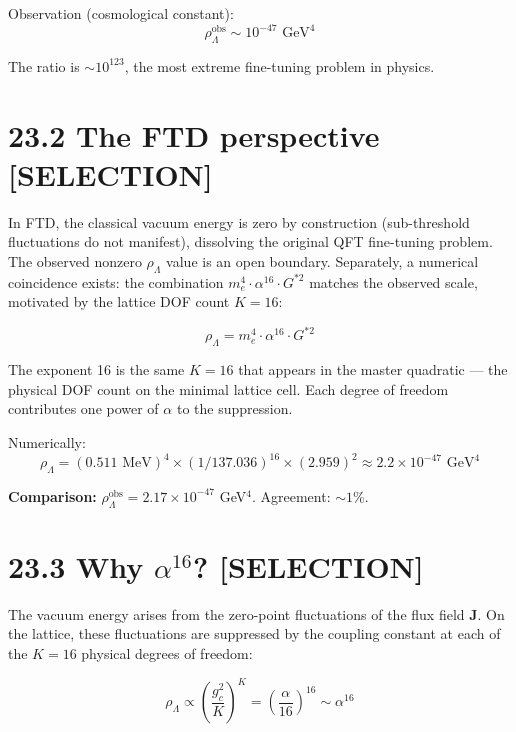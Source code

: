 \documentclass[
  11pt,
  letterpaper,
  twoside,
  openright]{book}
\begin{document}
Observation (cosmological constant): \[
\rho_\Lambda^{\text{obs}} \sim 10^{-47} \text{ GeV}^4
\]

The ratio is \(\sim 10^{123}\), the most extreme fine-tuning problem in
physics.

\section{23.2 The FTD perspective
{[}SELECTION{]}}\label{the-ftd-perspective-selection}

In FTD, the classical vacuum energy is zero by construction
(sub-threshold fluctuations do not manifest), dissolving the original
QFT fine-tuning problem. The observed nonzero \(\rho_\Lambda\) value is
an open boundary. Separately, a numerical coincidence exists: the
combination \(m_e^4 \cdot \alpha^{16} \cdot G^{*2}\) matches the
observed scale, motivated by the lattice DOF count \(K = 16\):

\begin{ftdselection}

\[
\rho_\Lambda = m_e^4 \cdot \alpha^{16} \cdot G^{*2}
\tag{23.1}
\]

\end{ftdselection}

The exponent 16 is the same \(K = 16\) that appears in the master
quadratic --- the physical DOF count on the minimal lattice cell. Each
degree of freedom contributes one power of \(\alpha\) to the
suppression.

Numerically: \[
\rho_\Lambda = (0.511 \text{ MeV})^4 \times (1/137.036)^{16} \times (2.959)^2 \approx 2.2 \times 10^{-47} \text{ GeV}^4
\]

\textbf{Comparison:}
\(\rho_\Lambda^{\text{obs}} = 2.17 \times 10^{-47}\) GeV\(^4\).
Agreement: \(\sim 1\%\).

\section{\texorpdfstring{23.3 Why \(\alpha^{16}\)?
{[}SELECTION{]}}{23.3 Why \textbackslash alpha\^{}\{16\}? {[}SELECTION{]}}}\label{why-alpha16-selection}

The vacuum energy arises from the zero-point fluctuations of the flux
field \(\mathbf{J}\). On the lattice, these fluctuations are suppressed
by the coupling constant at each of the \(K = 16\) physical degrees of
freedom:

\[
\rho_\Lambda \propto \left(\frac{g_c^2}{K}\right)^K = \left(\frac{\alpha}{16}\right)^{16} \sim \alpha^{16}
\]
\end{document}

